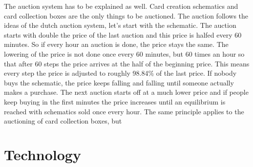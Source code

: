 \documentclass{article}
\begin{document}
%
\newline\newline
%
The auction system has to be explained as well. Card creation schematics and card collection boxes are the only things to be auctioned. The auction follows the ideas of the dutch auction system, let's start with the schematic. The auction starts with double the price of the last auction and this price is halfed every 60 minutes. So if every hour an auction is done, the price stays the same. The lowering of the price is not done once every 60 minutes, but 60 times an hour so that after 60 steps the price arrives at the half of the beginning price. This means every step the price is adjusted to roughly 98.84\% of the last price. If nobody buys the schematic, the price keeps falling and falling until someone actually makes a purchase. The next auction starts off at a much lower price and if people keep buying in the first minutes the price increases until an equilibrium is reached with schematics sold once every hour. The same principle applies to the auctioning of card collection boxes, but 
%
\section{Technology}
%
\end{document}

